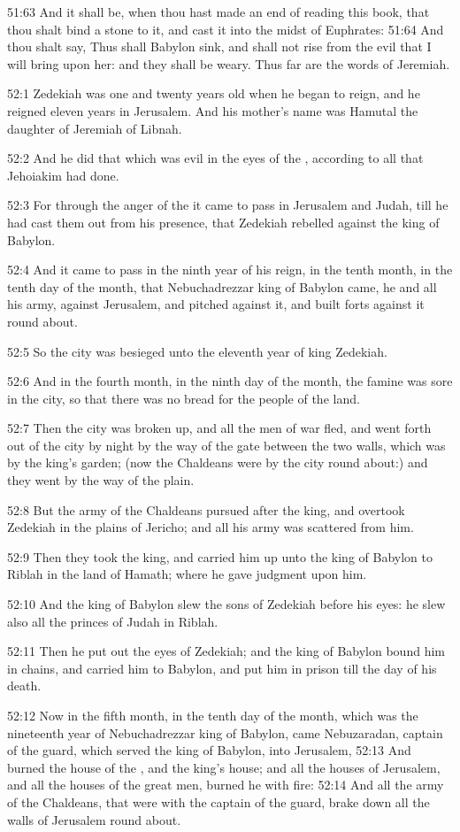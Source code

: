51:63 And it shall be, when thou hast made an end of reading this
book, that thou shalt bind a stone to it, and cast it into the midst
of Euphrates: 51:64 And thou shalt say, Thus shall Babylon sink, and
shall not rise from the evil that I will bring upon her: and they
shall be weary. Thus far are the words of Jeremiah.

52:1 Zedekiah was one and twenty years old when he began to reign, and
he reigned eleven years in Jerusalem. And his mother's name was
Hamutal the daughter of Jeremiah of Libnah.

52:2 And he did that which was evil in the eyes of the \LORD, according
to all that Jehoiakim had done.

52:3 For through the anger of the \LORD it came to pass in Jerusalem
and Judah, till he had cast them out from his presence, that Zedekiah
rebelled against the king of Babylon.

52:4 And it came to pass in the ninth year of his reign, in the tenth
month, in the tenth day of the month, that Nebuchadrezzar king of
Babylon came, he and all his army, against Jerusalem, and pitched
against it, and built forts against it round about.

52:5 So the city was besieged unto the eleventh year of king Zedekiah.

52:6 And in the fourth month, in the ninth day of the month, the
famine was sore in the city, so that there was no bread for the people
of the land.

52:7 Then the city was broken up, and all the men of war fled, and
went forth out of the city by night by the way of the gate between the
two walls, which was by the king's garden; (now the Chaldeans were by
the city round about:) and they went by the way of the plain.

52:8 But the army of the Chaldeans pursued after the king, and
overtook Zedekiah in the plains of Jericho; and all his army was
scattered from him.

52:9 Then they took the king, and carried him up unto the king of
Babylon to Riblah in the land of Hamath; where he gave judgment upon
him.

52:10 And the king of Babylon slew the sons of Zedekiah before his
eyes: he slew also all the princes of Judah in Riblah.

52:11 Then he put out the eyes of Zedekiah; and the king of Babylon
bound him in chains, and carried him to Babylon, and put him in prison
till the day of his death.

52:12 Now in the fifth month, in the tenth day of the month, which was
the nineteenth year of Nebuchadrezzar king of Babylon, came
Nebuzaradan, captain of the guard, which served the king of Babylon,
into Jerusalem, 52:13 And burned the house of the \LORD, and the king's
house; and all the houses of Jerusalem, and all the houses of the
great men, burned he with fire: 52:14 And all the army of the
Chaldeans, that were with the captain of the guard, brake down all the
walls of Jerusalem round about.

